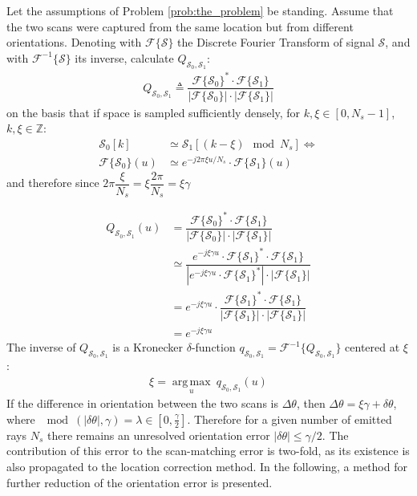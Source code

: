 Let the assumptions of Problem \ref{prob:the_problem} be standing. Assume that
the two scans were captured from the same location but from different
orientations. Denoting with $\mathcal{F}\{\mathcal{S}\}$ the Discrete Fourier
Transform of signal $\mathcal{S}$, and with $\mathcal{F}^{-1}\{\mathcal{S}\}$
its inverse, calculate $Q_{\mathcal{S}_0, \mathcal{S}_1}$:
\begin{align}
  Q_{\mathcal{S}_0, \mathcal{S}_1} \triangleq \dfrac{\mathcal{F}\{\mathcal{S}_0\}^{\ast} \cdot \mathcal{F}\{\mathcal{S}_1\}}{|\mathcal{F}\{\mathcal{S}_0\}| \cdot |\mathcal{F}\{\mathcal{S}_1\}|}
\end{align}
on the basis that if space is sampled sufficiently densely, for
$k,\xi \in [0, N_s-1]$, $k,\xi \in \mathbb{Z}$:
\begin{align}
  \mathcal{S}_0[k] &\simeq \mathcal{S}_1[(k - \xi) \mod N_s] \Leftrightarrow \nonumber \\
  \mathcal{F}\{\mathcal{S}_0\}(u) &\simeq e^{-j 2\pi \xi u / N_s} \cdot \mathcal{F}\{\mathcal{S}_1\}(u) \nonumber
\end{align}
and therefore since $2\pi \dfrac{\xi}{N_s} = \xi \dfrac{2\pi}{N_s} = \xi \gamma$

\begin{align}
  Q_{\mathcal{S}_0, \mathcal{S}_1}(u) &= \dfrac{\mathcal{F}\{\mathcal{S}_0\}^{\ast} \cdot \mathcal{F}\{\mathcal{S}_1\}}{|\mathcal{F}\{\mathcal{S}_0\}| \cdot |\mathcal{F}\{\mathcal{S}_1\}|}  \nonumber \\
  &\simeq \dfrac{e^{-j \xi \gamma  u} \cdot \mathcal{F}\{\mathcal{S}_1\}^\ast \cdot \mathcal{F}\{\mathcal{S}_1\}}{|e^{-j \xi \gamma u} \cdot \mathcal{F}\{\mathcal{S}_1\}^\ast | \cdot | \mathcal{F}\{\mathcal{S}_1\}|} \nonumber \\
  &= e^{-j \xi \gamma u} \cdot \dfrac{\mathcal{F}\{\mathcal{S}_1\}^\ast \cdot \mathcal{F}\{\mathcal{S}_1\}}{|\mathcal{F}\{\mathcal{S}_1\} | \cdot | \mathcal{F}\{\mathcal{S}_1\}|} \nonumber \\
  &= e^{-j \xi \gamma u}
  \label{eq:Q0}
\end{align}
The inverse of $Q_{\mathcal{S}_0, \mathcal{S}_1}$ is a Kronecker
$\delta$-function
$q_{\mathcal{S}_0, \mathcal{S}_1} = \mathcal{F}^{-1}\{Q_{\mathcal{S}_0, \mathcal{S}_1}\}$
centered at $\xi$:
\begin{align}
  \xi = \operatorname*{arg\,max}\limits_u \ q_{\mathcal{S}_0, \mathcal{S}_1}(u)
\end{align}
If the difference in orientation between the two scans is $\Delta\theta$, then
$\Delta\theta = \xi\gamma + \delta\theta$, where
$\mod(|\delta\theta|, \gamma) = \lambda \in [0,\frac{\gamma}{2}]$. Therefore for
a given number of emitted rays $N_s$ there remains an unresolved orientation
error $|\delta\theta| \leq \gamma/2$. The contribution of this error to the
scan-matching error is two-fold, as its existence is also propagated to the
location correction method. In the following, a method for further reduction of
the orientation error is presented.

